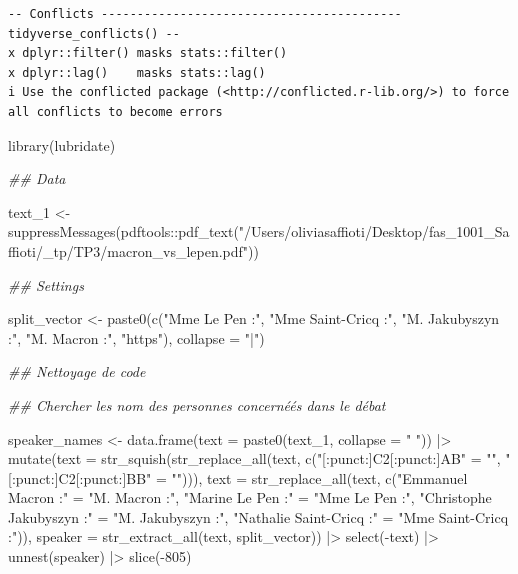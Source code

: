 \documentclass[
  letterpaper,
  DIV=11,
  numbers=noendperiod]{scrartcl}
\newenvironment{Shaded}{\begin{snugshade}}{\end{snugshade}}
\newcommand{\AttributeTok}[1]{\textcolor[rgb]{0.40,0.45,0.13}{#1}}
\newcommand{\DecValTok}[1]{\textcolor[rgb]{0.68,0.00,0.00}{#1}}
\newcommand{\DocumentationTok}[1]{\textcolor[rgb]{0.37,0.37,0.37}{\textit{#1}}}
\newcommand{\FunctionTok}[1]{\textcolor[rgb]{0.28,0.35,0.67}{#1}}
\newcommand{\NormalTok}[1]{\textcolor[rgb]{0.00,0.23,0.31}{#1}}
\newcommand{\OtherTok}[1]{\textcolor[rgb]{0.00,0.23,0.31}{#1}}
\newcommand{\SpecialCharTok}[1]{\textcolor[rgb]{0.37,0.37,0.37}{#1}}
\newcommand{\StringTok}[1]{\textcolor[rgb]{0.13,0.47,0.30}{#1}}
\begin{document}
\begin{verbatim}
-- Conflicts ------------------------------------------ tidyverse_conflicts() --
x dplyr::filter() masks stats::filter()
x dplyr::lag()    masks stats::lag()
i Use the conflicted package (<http://conflicted.r-lib.org/>) to force all conflicts to become errors
\end{verbatim}

\begin{Shaded}
\begin{Highlighting}[]
\FunctionTok{library}\NormalTok{(lubridate)}

\DocumentationTok{\#\# Data}

\NormalTok{text\_1 }\OtherTok{\textless{}{-}} \FunctionTok{suppressMessages}\NormalTok{(pdftools}\SpecialCharTok{::}\FunctionTok{pdf\_text}\NormalTok{(}\StringTok{"/Users/oliviasaffioti/Desktop/fas\_1001\_Saffioti/\_tp/TP3/macron\_vs\_lepen.pdf"}\NormalTok{))}

\DocumentationTok{\#\# Settings}

\NormalTok{split\_vector }\OtherTok{\textless{}{-}} \FunctionTok{paste0}\NormalTok{(}\FunctionTok{c}\NormalTok{(}\StringTok{"Mme Le Pen :"}\NormalTok{, }\StringTok{"Mme Saint{-}Cricq :"}\NormalTok{, }\StringTok{"M. Jakubyszyn :"}\NormalTok{, }\StringTok{"M. Macron :"}\NormalTok{, }\StringTok{"https"}\NormalTok{), }\AttributeTok{collapse =} \StringTok{"|"}\NormalTok{)}


\DocumentationTok{\#\# Nettoyage de code}

\DocumentationTok{\#\# Chercher les nom des personnes concernéés dans le débat}

\NormalTok{speaker\_names }\OtherTok{\textless{}{-}} \FunctionTok{data.frame}\NormalTok{(}\AttributeTok{text =} \FunctionTok{paste0}\NormalTok{(text\_1, }\AttributeTok{collapse =} \StringTok{" "}\NormalTok{)) }\SpecialCharTok{|\textgreater{}}
  \FunctionTok{mutate}\NormalTok{(}\AttributeTok{text =} \FunctionTok{str\_squish}\NormalTok{(}\FunctionTok{str\_replace\_all}\NormalTok{(text, }\FunctionTok{c}\NormalTok{(}\StringTok{"[:punct:]C2[:punct:]AB"}  \OtherTok{=} \StringTok{""}\NormalTok{,}
                                                   \StringTok{"[:punct:]C2[:punct:]BB"}  \OtherTok{=} \StringTok{""}\NormalTok{))),}
         \AttributeTok{text =} \FunctionTok{str\_replace\_all}\NormalTok{(text, }\FunctionTok{c}\NormalTok{(}\StringTok{"Emmanuel Macron :"}       \OtherTok{=} \StringTok{"M. Macron :"}\NormalTok{,}
                                        \StringTok{"Marine Le Pen :"}         \OtherTok{=} \StringTok{"Mme Le Pen :"}\NormalTok{,}
                                        \StringTok{"Christophe Jakubyszyn :"} \OtherTok{=} \StringTok{"M. Jakubyszyn :"}\NormalTok{,}
                                        \StringTok{"Nathalie Saint{-}Cricq :"}  \OtherTok{=} \StringTok{"Mme Saint{-}Cricq :"}\NormalTok{)),}
         \AttributeTok{speaker =} \FunctionTok{str\_extract\_all}\NormalTok{(text, split\_vector)) }\SpecialCharTok{|\textgreater{}} 
  \FunctionTok{select}\NormalTok{(}\SpecialCharTok{{-}}\NormalTok{text) }\SpecialCharTok{|\textgreater{}} 
  \FunctionTok{unnest}\NormalTok{(speaker) }\SpecialCharTok{|\textgreater{}} 
  \FunctionTok{slice}\NormalTok{(}\SpecialCharTok{{-}}\DecValTok{805}\NormalTok{)}
  

\end{Highlighting}
\end{Shaded}
\end{document}
